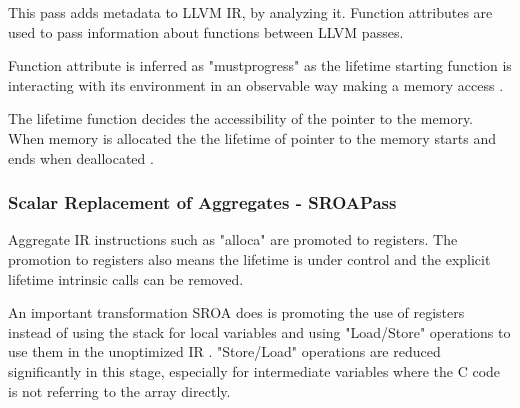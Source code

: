  This pass adds metadata to LLVM IR, by analyzing it. Function attributes are used to pass information about functions between LLVM passes.

 
 

 Function attribute is inferred as "mustprogress" as the lifetime starting function is interacting with its environment in an observable way making a memory access \cite{llvmref-funcAttrs}. 
 \par
The lifetime function decides the accessibility of the pointer to the memory. When memory is allocated the the lifetime of pointer to the memory starts and ends when deallocated \cite{llvmref-objectLifetime}.

\subsubsection{Scalar Replacement of Aggregates - SROAPass}

Aggregate IR instructions such as "alloca" are promoted to registers. The promotion to registers also means the lifetime is under control and the explicit lifetime intrinsic calls can be removed.

 
 

An important transformation SROA does is promoting the use of registers instead of using the stack for local variables and using "Load/Store" operations to use them in the unoptimized IR \cite{llvmcode-sroa}. "Store/Load" operations are reduced significantly in this stage, especially for intermediate variables where the C code is not referring to the array directly. 



